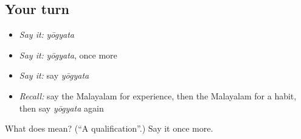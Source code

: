 \subsection*{Your turn}
\begin{itemize}
\raggedright
  \item \emph{Say it:} \emph{yōgyata}
  \item \emph{Say it:} \emph{yōgyata}, once more
  \item \emph{Say it:} say \emph{yōgyata}
  \item \emph{Recall:} say the Malayalam for experience, then the Malayalam for a habit, then say \emph{yōgyata} again
\end{itemize}

\begin{tcolorbox}[breakable,colback=teal!4,colframe=teal!35!black,title={Before you move on}]
What does  mean? (\textquotedblleft{}A qualification\textquotedblright{}.) Say it once more.
\end{tcolorbox}
